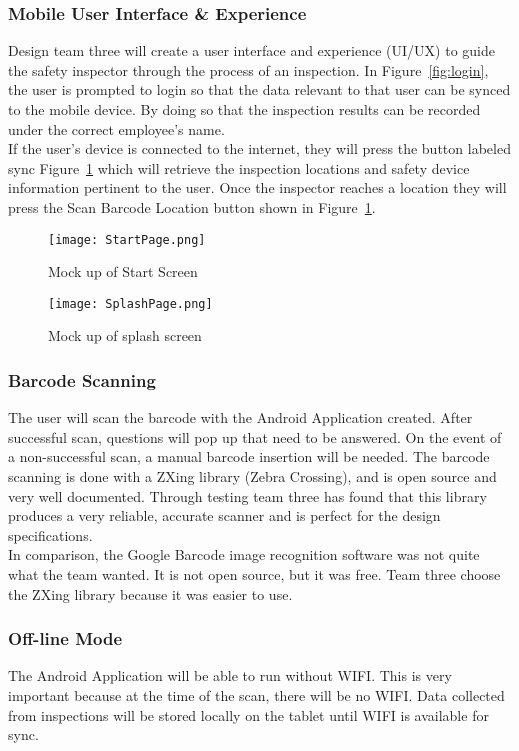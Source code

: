 \documentclass[Letter,11pt]{article}
\begin{document}
	\subsubsection{Mobile User Interface \& Experience}
	Design team three will create a user interface and experience (UI/UX) to guide the safety inspector through the process of an inspection. In  Figure~\ref{fig:login}, the user is prompted to login so that the data relevant to that user can be synced to the mobile device. By doing so that the inspection results can be recorded under the correct employee's name. \\
	If the user's device is connected to the internet, they will press the button labeled sync Figure~\ref{fig:splash} which will retrieve the inspection locations and safety device information pertinent to the user.
	Once the inspector reaches a location they will press the Scan Barcode Location button shown in Figure~\ref{fig:splash}.
	\begin{figure}[h]

		\begin{minipage}{0.5\textwidth}
			\centering
			\texttt{[image: StartPage.png]}
			\caption{\label{fig:login}Mock up of Start Screen}
		\end{minipage}%
		\begin{minipage}{0.5\textwidth}
			\centering
			\texttt{[image: SplashPage.png]}
			\caption{\label{fig:splash}Mock up of splash screen}
		\end{minipage}
	\end{figure}

	\subsubsection{Barcode Scanning}
	The user will scan the barcode with the Android Application created. After successful scan, questions will pop up that need to be answered. On the event of a non-successful scan, a manual barcode insertion will be needed. The barcode scanning is done with a ZXing library (Zebra Crossing), and is open source and very well documented. Through testing team three has found that this library produces a very reliable, accurate scanner and is perfect for the design specifications.\\
	In comparison, the Google Barcode  image recognition software was not quite what the team wanted. It is not open source, but it was free. Team three choose the ZXing library because it was easier to use.
	\subsubsection{Off-line Mode}
	The Android Application will be able to run without WIFI. This is very important because at the time of the scan, there will be no WIFI. Data collected from inspections will be stored locally on the tablet until WIFI is available for sync. 
\end{document}
